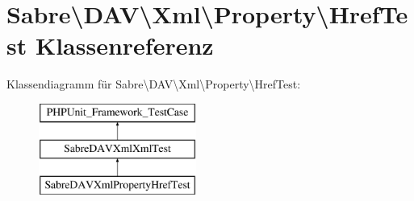 \hypertarget{class_sabre_1_1_d_a_v_1_1_xml_1_1_property_1_1_href_test}{}\section{Sabre\textbackslash{}D\+AV\textbackslash{}Xml\textbackslash{}Property\textbackslash{}Href\+Test Klassenreferenz}
\label{class_sabre_1_1_d_a_v_1_1_xml_1_1_property_1_1_href_test}
Klassendiagramm für Sabre\textbackslash{}D\+AV\textbackslash{}Xml\textbackslash{}Property\textbackslash{}Href\+Test\+:\begin{figure}[H]
\begin{center}
\leavevmode
\includegraphics[height=3.000000cm]{class_sabre_1_1_d_a_v_1_1_xml_1_1_property_1_1_href_test}
\end{center}
\end{figure}
